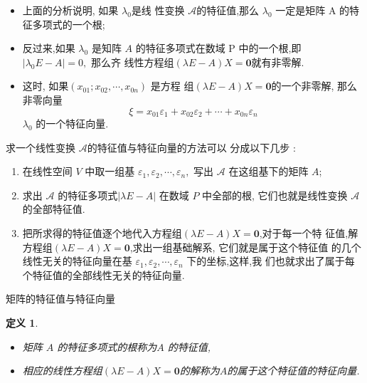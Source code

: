 \documentclass[13pt]{beamer}
\newtheorem*{defi}{定义}
\def\A{\mathscr{A}}
\begin{document}
\begin{frame}
\begin{itemize}
\item 上面的分析说明, 如果 $\lambda_0$是线 性变换 $\A$的特征值,那么 $\lambda_0$
一定是矩阵 A 的特征多项式的一个根;
\item 反过来,如果 $\lambda_{0}$ 是知阵 ${A}$ 的特征多项式在数域 P 中的一个根,即  $|\lambda_{0} {E}-{A} |=0,$ 那么齐 线性方程组$(\lambda E-A)X=\mathbf{0}$就有非零解. 
\item 这时, 如果$\left( x_{01} ; x_{02}, \cdots, x_{0 n}\right)$ 是方程
组$(\lambda E-A)X=\mathbf{0}$的一个非零解, 那么非零向量
\[
\xi=x_{01} \varepsilon_{1}+x_{02} \varepsilon_{2}+\cdots+x_{0 n} \varepsilon_{n}
\]
$\lambda_{0}$ 的一个特征向量. 
\end{itemize}





\end{frame}

\begin{frame}
求一个线性变换 $\A$的特征值与特征向量的方法可以
分成以下几步 :
\begin{enumerate}
	\item 在线性空间 $V$ 中取一组基 ${\varepsilon}_{1}, {\varepsilon}_{2}, \cdots, {\varepsilon}_{n},$ 写出 $\mathscr{A}$ 在这组基下的矩阵 $A$;
	\item 求出 $\A$ 的特征多项式$|\lambda {E}-{A} |$ 在数域 $P$ 中全部的根, 它们也就是线性变换 $\A$ 的全部特征值. 
	\item 把所求得的特征值逐个地代入方程组$(\lambda E-A)X=\mathbf{0}$,对于每一个特 征值,解方程组$(\lambda E-A)X=\mathbf{0}$,求出一组基础解系, 它们就是属于这个特征值 的几个线性无关的特征向量在基 ${\varepsilon}_{1}, {\varepsilon}_{2}, \cdots, {\varepsilon}_{n}$ 下的坐标,这样,我
	们也就求出了属于每个特征值的全部线性无关的特征向量. 
\end{enumerate}

\end{frame}

\begin{frame}{矩阵的特征值与特征向量}
\begin{defi}
\begin{itemize}
	\item 矩阵 $A$ 的特征多项式的根称为$A$ 的特征值,
	\item 相应的线性方程组$(\lambda E-A)X=\mathbf{0}$的解称为$A$的属于这个特征值的特征向量.  
\end{itemize}

\end{defi}
\end{frame}
\end{document}
